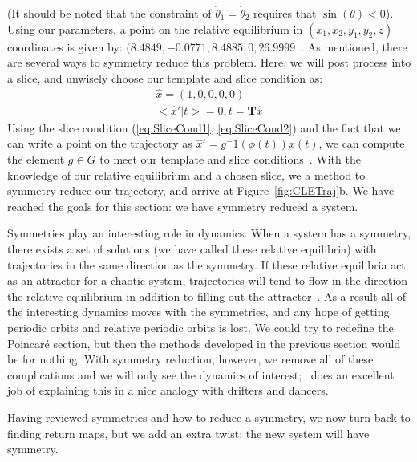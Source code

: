 \documentclass[12 pt]{article}
\begin{document}
(It should be noted that the constraint of $\dot \theta_1 = \dot
\theta_2$ requires that $\sin(\theta) < 0$).  Using our parameters, a
point on the relative equilibrium in $(x_1, x_2, y_1, y_2, z)$
coordinates is given by: $(8.4849,-0.0771,8.4885,0,26.9999$~\cite{CB}. As
mentioned, there are several ways to symmetry reduce this problem.  Here,
we will post process into a slice, and unwisely choose our template and
slice condition as:
\begin{equation}
\begin{split}
\hat{x} = (1, 0, 0, 0 , 0)\\
<\hat{x}'|t> = 0, t = \mathbf{T}\hat{x}
\label{eq:CLEslice}
\end{split}
\end{equation}
Using the slice condition (\ref{eq:SliceCond1}, \ref{eq:SliceCond2}) and
the fact that we can write a point on the trajectory as $\hat{x}' =
g^-1(\phi(t))x(t)$, we can compute the element $g \in G$ to meet our
template and slice conditions~\cite{SliceCond}. With the knowledge of our
relative equilibrium and a chosen slice, we a method to symmetry reduce
our trajectory, and arrive at Figure~\ref{fig:CLETraj}b.  We have reached
the goals for this section: we have symmetry reduced a system.

Symmetries play an interesting role in dynamics.  When a system has a
symmetry, there exists a set of solutions (we have called these relative
equilibria) with trajectories in the same direction as the symmetry.  If
these relative equilibria act as an attractor for a chaotic system,
trajectories will tend to flow in the direction the relative equilibrium
in addition to filling out the attractor~\cite{Atl}.  As a result all of
the interesting dynamics moves with the symmetries, and any hope of
getting periodic orbits and relative periodic orbits is lost.  We could
try to redefine the Poincar\'e section, but then the methods developed in
the previous section would be for nothing.  With symmetry reduction,
however, we remove all of these complications and we will only see the
dynamics of interest;~\cite{Atl} does an excellent job of explaining this
in a nice analogy with drifters and dancers.

Having reviewed symmetries and how to reduce a symmetry, we now turn back
to finding return maps, but we add an extra twist: the new system will
have symmetry.
\end{document}
